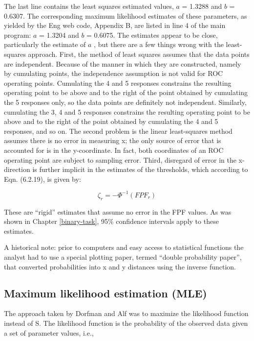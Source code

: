 \documentclass[
]{book}
\begin{document}
The last line contains the least squares estimated values, \(a\) = 1.3288 and \(b\) = 0.6307. The corresponding maximum likelihood estimates of these parameters, as yielded by the Eng web code, Appendix B, are listed in line 4 of the main program: \(a\) = 1.3204 and \(b\) = 0.6075. The estimates appear to be close, particularly the estimate of \(a\) , but there are a few things wrong with the least-squares approach. First, the method of least squares assumes that the data points are independent. Because of the manner in which they are constructed, namely by cumulating points, the independence assumption is not valid for ROC operating points. Cumulating the 4 and 5 responses constrains the resulting operating point to be above and to the right of the point obtained by cumulating the 5 responses only, so the data points are definitely not independent. Similarly, cumulating the 3, 4 and 5 responses constrains the resulting operating point to be above and to the right of the point obtained by cumulating the 4 and 5 responses, and so on. The second problem is the linear least-squares method assumes there is no error in measuring x; the only source of error that is accounted for is in the y-coordinate. In fact, both coordinates of an ROC operating point are subject to sampling error. Third, disregard of error in the x-direction is further implicit in the estimates of the thresholds, which according to Eqn. (6.2.19), is given by:

\begin{equation*} 
\zeta_r = - \Phi^{-1}\left ( FPF_r \right )
\end{equation*}

These are ``rigid'' estimates that assume no error in the FPF values. As was shown in Chapter \ref{binary-task}, 95\% confidence intervals apply to these estimates.

A historical note: prior to computers and easy access to statistical functions the analyst had to use a special plotting paper, termed ``double probability paper'', that converted probabilities into x and y distances using the inverse function.

\hypertarget{maximum-likelihood-estimation-mle}{%
\subsection{Maximum likelihood estimation (MLE)}\label{maximum-likelihood-estimation-mle}}

The approach taken by Dorfman and Alf was to maximize the likelihood function instead of S. The likelihood function is the probability of the observed data given a set of parameter values, i.e.,
\end{document}
